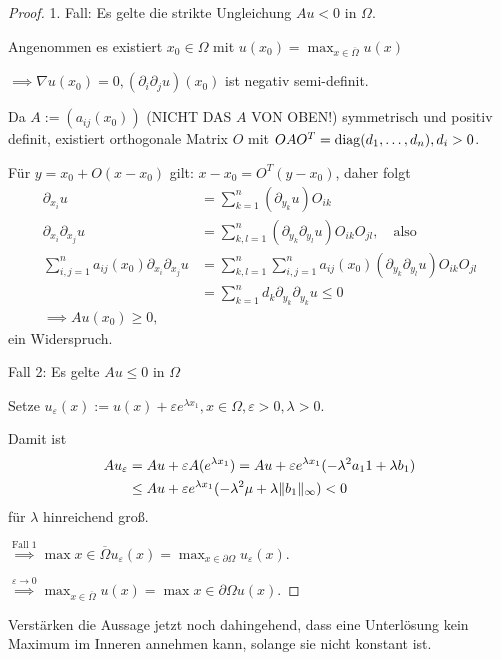 \begin{proof}
  1. Fall: Es gelte die strikte Ungleichung $Au < 0$ in $\Omega$.

  Angenommen es existiert $x_0 \in \Omega$ mit $u(x_0) = \max_{x \in \overline\Omega} u(x)$

  $\implies \nabla u(x_0) = 0, (\partial_i \partial_j u)(x_0)$ ist negativ semi-definit.

  Da $A:=(a_{ij}(x_0))$ (NICHT DAS $A$ VON OBEN!) symmetrisch und positiv definit, existiert orthogonale Matrix $O$ mit $OAO^T = \operatorname{diag}(d_1,\dots,d_n), d_i > 0$.

  Für $y = x_0 + O(x - x_0)$ gilt: $x - x_0 = O^T(y - x_0)$, daher folgt
  \begin{align*}
    \partial_{x_i} u &= \sum_{k = 1}^n (\partial_{y_k} u) O_{ik} \\
    \partial_{x_i} \partial_{x_j} u &= \sum_{k,l = 1}^n (\partial_{y_k}\partial_{y_l} u) O_{ik} O_{jl}, \quad\text{also}\\
    \sum_{i,j=1}^n a_{ij}(x_0) \partial_{x_i} \partial_{x_j} u &= \sum_{k,l = 1}^n \sum_{i,j = 1}^n a_{ij}(x_0) (\partial_{y_k} \partial_{y_l} u) O_{ik} O_{jl} \\
    &= \sum_{k = 1}^n d_k \partial_{y_k} \partial_{y_k} u \leq 0 \\
    \implies Au(x_0) \geq 0,
  \end{align*}
  ein Widerspruch.

  Fall 2: Es gelte $A u \leq 0$ in $\Omega$

  Setze $u_\varepsilon(x) := u(x) + \varepsilon e^{\lambda x_1}, x \in \Omega, \varepsilon > 0, \lambda > 0.$

  Damit ist 
  \begin{align*}
  A u_\varepsilon &= Au + \varepsilon A(e^{\lambda x_1}) = A u + \varepsilon e^{\lambda x_1} (-\lambda^2 a_11 + \lambda b_1) \\
  &\leq Au + \varepsilon e^{\lambda x_1} (-\lambda^2 \mu + \lambda \lVert b_1 \rVert_\infty ) < 0
  \end{align*}
  für $\lambda$ hinreichend groß.

  $\overset{\text{Fall 1}}{\implies} \max{x \in \overline\Omega} u_\varepsilon(x)  = \max_{x \in \partial\Omega} u_\varepsilon(x)$.

  $\overset{\varepsilon \to 0}{\implies} \max_{x \in \overline\Omega} u(x) = \max{x \in \partial\Omega} u(x)$.
\end{proof}

Verstärken die Aussage jetzt noch dahingehend, dass eine Unterlösung kein Maximum im Inneren annehmen kann, solange sie nicht konstant ist.

